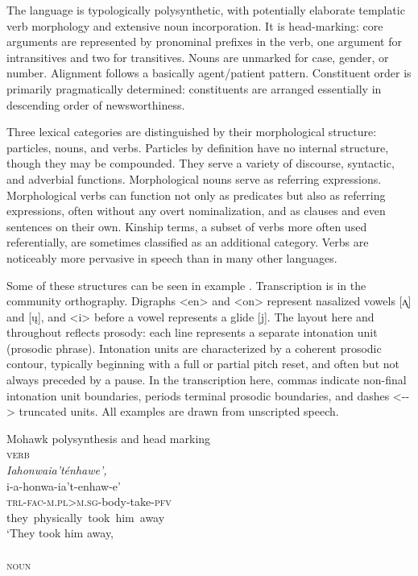 \documentclass[output=paper]{langscibook}
\begin{document}
The language is typologically polysynthetic, with potentially elaborate templatic verb morphology and extensive noun incorporation. It is head-marking: core arguments are represented by pronominal prefixes in the verb, one argument for intransitives and two for transitives. Nouns are unmarked for case, gender, or number. Alignment follows a basically agent/patient pattern. Constituent order is primarily pragmatically determined: constituents are arranged essentially in descending order of newsworthiness.

Three lexical categories are distinguished by their morphological structure: particles, nouns, and verbs. Particles by definition have no internal structure, though they may be compounded. They serve a variety of discourse, syntactic, and adverbial functions. Morphological nouns serve as referring expressions. Morphological verbs can function not only as predicates but also as referring expressions, often without any overt nominalization, and as clauses and even sentences on their own. Kinship terms, a subset of verbs more often used referentially, are sometimes classified as an additional category. Verbs are noticeably more pervasive in speech than in many other languages.

Some of these structures can be seen in example . Transcription is in the community orthography. Digraphs <en> and <on> represent nasalized vowels [ʌ̨] and [ų], and <i> before a vowel represents a glide [j]. The layout here and throughout reflects prosody: each line represents a separate intonation unit (prosodic phrase). Intonation units are characterized by a coherent prosodic contour, typically beginning with a full or partial pitch reset, and often but not always preceded by a pause. In the transcription here, commas indicate non-final intonation unit boundaries, periods terminal prosodic boundaries, and dashes \mbox{<-{}->} truncated units. All examples are drawn from unscripted speech.

\ea%
    \label{ex:mithun:1}
    Mohawk polysynthesis and head marking\\
    \textsc{verb}\\
   \gllll \textit{Iahonwaia’ténhawe’,} \\
    i-a-honwa-ia’t-enhaw-e’  \\
    \textsc{trl-fac-m.pl>m.sg-}body-take-\textsc{pfv}\\
    {they~physically~took~him~away}\\
    \glt ‘They took him away,\\
    ~\\
    \textsc{noun}        \\
    
\end{document}
